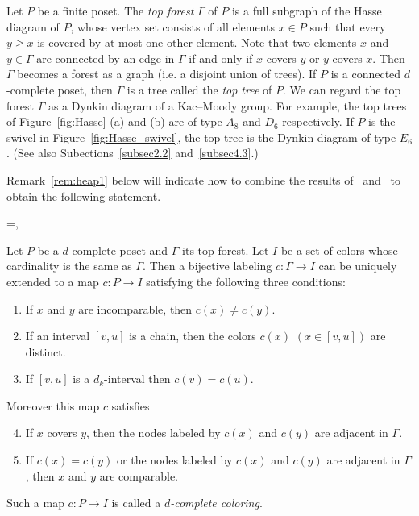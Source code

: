 \documentclass[ALCO,ThmDefs,Unicode,epreuves]{cedram}
\begin{document}
Let $P$ be a finite poset.
The \emph{top forest} $\Gamma$ of $P$ is a full subgraph of 
the Hasse diagram of $P$, whose vertex set consists of all elements $x \in P$ 
such that every $y \ge x$ is covered by at most one other element. 
Note that two elements $x$ and $y \in \Gamma$ are connected by an edge in $\Gamma$ 
if and only if $x$ covers $y$ or $y$ covers $x$.
Then $\Gamma$ becomes a forest as a graph (i.e. a disjoint union of trees).
If $P$ is a connected $d$-complete poset, then $\Gamma$ is a tree called 
the \emph{top tree} of $P$.
We can regard the top forest $\Gamma$ as a Dynkin diagram of a Kac--Moody group.
For example, the top trees of Figure~\ref{fig:Hasse} (a) and (b) are
of type $A_8$ and $D_6$ respectively. 
If $P$ is the swivel in Figure~\ref{fig:Hasse_swivel}, the top tree is
the Dynkin diagram of type $E_6$.
(See also Subections~\ref{subsec2.2} and~\ref{subsec4.3}.)

Remark~\ref{rem:heap1} below will indicate how to combine the results 
of~\cite{Proc2} and~\cite{Stem2} to obtain the following statement.

\setbox\toto=\hbox{\cite[Proposition~8.6]{Proc2},~\cite[Proposition~3.1]{Stem2}}
\begin{prop}[\box\toto]
\label{prop:dc_color}
Let $P$ be a $d$-complete poset and $\Gamma$ its top forest.
Let $I$ be a set of colors whose cardinality is the same as $\Gamma$.
Then a bijective labeling $c : \Gamma \to I$ can be uniquely extended to a map 
$c : P \to I$ satisfying the following three conditions:
\begin{enumerate}[(C1)]
\item\label{prop2.5_C1} %
If $x$ and $y$ are incomparable, then $c(x) \neq c(y)$.
\item\label{prop2.5_C2} %
If an interval $[v,u]$ is a chain, then the colors $c(x)$ $(x \in [v,u])$ are 
distinct.
\item\label{prop2.5_C3} %
If $[v,u]$ is a $d_k$-interval then $c(v) = c(u)$.
\end{enumerate}
Moreover this map $c$ satisfies
\begin{enumerate}[(C1)]\setcounter{enumi}{3}
\item\label{prop2.5_C4} %
If $x$ covers $y$, then the nodes labeled by $c(x)$ and $c(y)$ are adjacent in $\Gamma$.
\item\label{prop2.5_C5} %
If $c(x) = c(y)$ or the nodes labeled by $c(x)$ and $c(y)$ are adjacent in $\Gamma$, 
then $x$ and $y$ are comparable.
\end{enumerate}
Such a map $c : P \to I$ is called a \emph{$d$-complete coloring}.
\end{prop}
\end{document}
